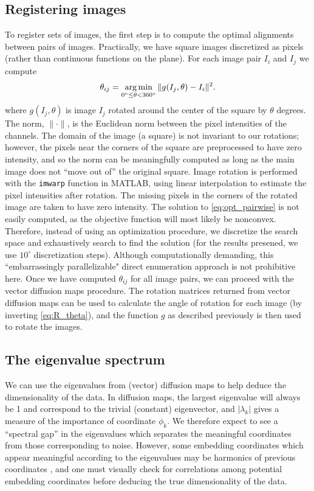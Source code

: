 \subsection{Registering images} \label{subsec:trans_rot_register}

To register sets of images, 
the first step is to compute the optimal alignments between pairs of images.
%
Practically, we have square images discretized as pixels (rather than continuous functions on the plane).
%
For each image pair $I_i$ and $I_j$ we compute
\begin{equation}\label{eq:opt_pairwise}
\theta_{ij} = \operatorname*{arg\,min}_{
0^\circ \le \theta < 360^\circ }
 \|g(I_j, \theta) - I_i \|^2.
\end{equation}
where $g(I_j, \theta)$ is image $I_j$ rotated around the center of the square by $\theta$ degrees.
%
The norm, $\| \cdot \|$, is the Euclidean norm between the pixel intensities of the channels.
%
The domain of the image (a square) is not invariant to our rotations; however, the pixels near the corners of the square are preprocessed to have zero intensity, and so the norm can be meaningfully computed as long as the main image does not ``move out of'' the original square.
%
Image rotation is performed with the \texttt{imwarp} function in MATLAB, using linear interpolation to estimate the pixel intensities after rotation.
%
The missing pixels in the corners of the rotated image are taken to have zero intensity.
%
The solution to \eqref{eq:opt_pairwise} is not easily computed, as the objective function will most likely be nonconvex.
%
Therefore, instead of using an optimization procedure, we discretize the search space and exhaustively search to find the solution (for the results presened, we use $10^\circ$ discretization steps).
%
Although computationally demanding, this ``embarrassingly parallelizable" direct enumeration approach is not prohibitive here.
%
Once we have computed $\theta_{ij}$ for all image pairs, we can proceed with the vector diffusion maps procedure.
%
The rotation matrices returned from vector diffusion maps can be used to calculate the angle of rotation for each image (by inverting \eqref{eq:R_theta}), and the function $g$ as described previously is then used to rotate the images.

\subsection{The eigenvalue spectrum}

We can use the eigenvalues from (vector) diffusion maps to help deduce the dimensionality of the data.
%
In diffusion maps, the largest eigenvalue will always be 1 and correspond to the trivial (constant) eigenvector, and $|\lambda_k|$ gives a measure of the importance of coordinate $\phi_k$. 
%
We therefore expect to see a ``spectral gap'' in the eigenvalues which separates the meaningful coordinates from those corresponding to noise.
%
However, some embedding coordinates which appear meaningful according to the eigenvalues may be harmonics of previous coordinates \citep{ferguson2010systematic}, 
and one must visually check for correlations among potential embedding coordinates before deducing the true dimensionality of the data. 

